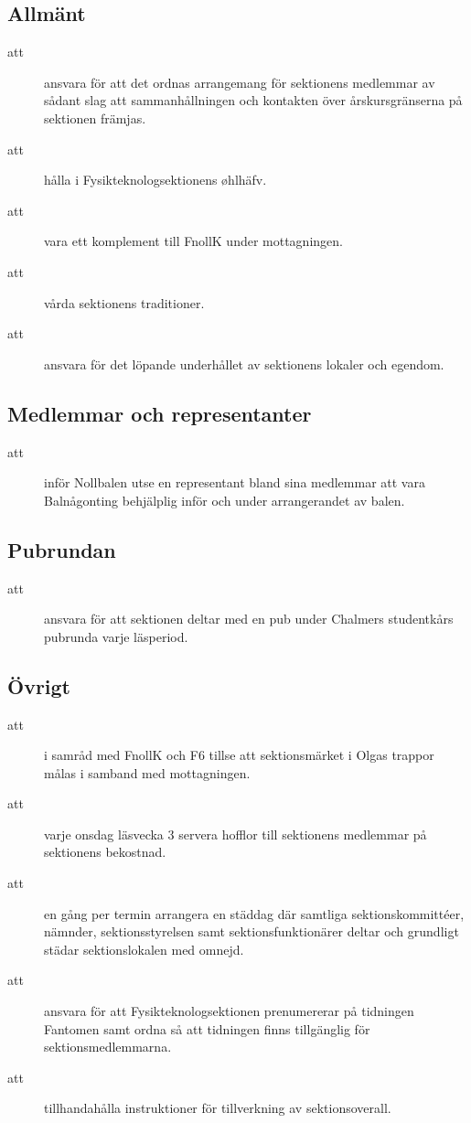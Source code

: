 \documentclass[a4paper]{article}
\begin{document}
\begin{foreningenv}{\forening{}}
    \subsection{Allmänt}
    \begin{description}
          \item[att] ansvara för att det ordnas arrangemang för sektionens medlemmar av sådant slag att sammanhållningen och kontakten över årskursgränserna på sektionen främjas.
          \item[att] hålla i Fysikteknologsektionens øhlhäfv.
          \item[att] vara ett komplement till FnollK under mottagningen.
          \item[att] vårda sektionens traditioner.
          \item[att] ansvara för det löpande underhållet av sektionens lokaler och egendom.
    \end{description}
    
    \subsection{Medlemmar och representanter}
    \begin{description}
        \item[att] inför Nollbalen utse en representant bland sina medlemmar att vara Balnågonting behjälplig inför och under arrangerandet av balen.
    \end{description}
    
    \subsection{Pubrundan}
    \begin{description}
        \item[att] ansvara för att sektionen deltar med en pub under Chalmers studentkårs pubrunda varje läsperiod.
    \end{description}
    
    \subsection{Övrigt}
    \begin{description}
        \item[att] i samråd med FnollK och F6 tillse att sektionsmärket i Olgas trappor målas i samband med mottagningen.
        \item[att] varje onsdag läsvecka 3 servera hofflor till sektionens medlemmar på sektionens bekostnad.
        \item[att] en gång per termin arrangera en städdag där samtliga sektionskommittéer, nämnder, sektionsstyrelsen samt sektionsfunktionärer deltar och grundligt städar sektionslokalen med omnejd.
        \item[att] ansvara för att Fysikteknologsektionen prenumererar på tidningen Fantomen samt ordna så att tidningen finns tillgänglig för sektionsmedlemmarna.
        \item[att] tillhandahålla instruktioner för tillverkning av sektionsoverall.
    \end{description}
    

\end{foreningenv}
\end{document}
